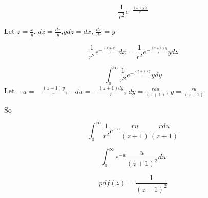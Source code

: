 \documentclass{article}
\begin{document}
$$\frac{1}{r^2} e^{-\frac{(x+y)}{r}}   $$

Let $z = \frac{x}{y}$,  $dz = \frac{dx}{y}$,$ydz = dx$, $\frac{dx}{dz} = y$

$$\frac{1}{r^2} e^{-\frac{(x+y)}{r}}  dx =  \frac{1}{r^2} e^{-\frac{(z+1)y}{r}}  ydz $$

$$\int_{0}^{\infty}\frac{1}{r^2} e^{-\frac{(z+1)y}{r}}  y dy $$ 
Let $-u = -\frac{(z+1)y}{r}$, $-du = -\frac{(z+1)dy}{r}$, $dy = \frac{rdu}{(z+1)}$, $y = \frac{ru}{(z+1)} $

So 

$$\int_{0}^{\infty}\frac{1}{r^2} e^{-u}  \frac{ru}{(z+1)} \frac{rdu}{(z+1)}$$ 

$$\int_{0}^{\infty} e^{-u}  \frac{u}{(z+1)^2} du $$

$$pdf(z)=\frac{1}{(z+1)^2}$$
\end{document}
